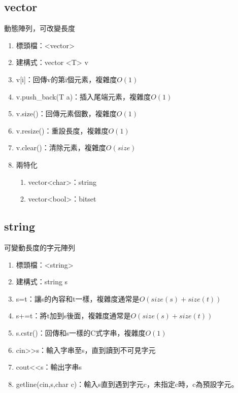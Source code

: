 \subsection{vector}
動態陣列，可改變長度
\begin{enumerate}
\item 標頭檔：<vector>
\item 建構式：vector <T> v
\item v[i]：回傳v的第i個元素，複雜度$O(1)$
\item v.push\_back(T a)：插入尾端元素，複雜度$O(1)$
\item v.size()：回傳元素個數，複雜度$O(1)$
\item v.resize()：重設長度，複雜度$O(1)$
\item v.clear()：清除元素，複雜度$O(size)$
\item 兩特化
    \begin{enumerate}
    \item vector<char>：string
    \item vector<bool>：bitset
    \end{enumerate}
\end{enumerate}

\subsection{string} 
可變動長度的字元陣列
\begin{enumerate}
\item 標頭檔：<string>
\item 建構式：string s
\item s=t：讓s的內容和t一樣，複雜度通常是$O(size(s)+size(t))$
\item s+=t：將t加到s後面，複雜度通常是$O(size(s)+size(t))$
\item s.cstr()：回傳和s一樣的C式字串，複雜度$O(1)$
\item cin>>s：輸入字串至s，直到讀到不可見字元
\item cout<<s：輸出字串s
\item getline(cin,s,char c)：輸入s直到遇到字元c，未指定c時，c為預設字元。
\end{enumerate}

